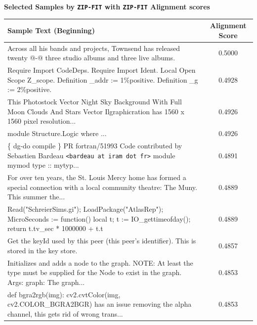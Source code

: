 \begin{table}[htbp]
    \centering
    \textbf{Selected Samples by \texttt{ZIP-FIT} with \texttt{ZIP-FIT} Alignment scores}\\[0.5em] 
    \begin{tabular}{|p{10cm}|c|}
        \hline
        \textbf{Sample Text (Beginning)} & \textbf{Alignment Score} \\ \hline
        Across all his bands and projects, Townsend has released twenty @-@ three studio albums and three live albums. & 0.5000 \\ \hline
        Require Import CodeDeps. Require Import Ident. Local Open Scope Z\_scope. Definition \_addr := 1\%positive. Definition \_g := 2\%positive. & 0.4928 \\ \hline
        This Photostock Vector Night Sky Background With Full Moon Clouds And Stars Vector Ilgraphicration has 1560 x 1560 pixel resolution... & 0.4926 \\ \hline
        module Structure.Logic where ... & 0.4926 \\ \hline
        \{ dg-do compile \} PR fortran/51993 Code contributed by Sebastien Bardeau \texttt{<bardeau at iram dot fr>} module mymod type :: mytyp... & 0.4891 \\ \hline
        For over ten years, the St. Louis Mercy home has formed a special connection with a local community theatre: The Muny. This summer the... & 0.4889 \\ \hline
        Read("SchreierSims.gi"); LoadPackage("AtlasRep"); MicroSeconds := function() local t; t := IO\_gettimeofday(); return t.tv\_sec * 1000000 + t.t & 0.4889 \\ \hline
        Get the keyId used by this peer (this peer's identifier). This is stored in the key store. & 0.4857 \\ \hline
        Initializes and adds a node to the graph. NOTE: At least the type must be supplied for the Node to exist in the graph. Args: graph: The graph... & 0.4853 \\ \hline
        def bgra2rgb(img): cv2.cvtColor(img, cv2.COLOR\_BGRA2BGR) has an issue removing the alpha channel, this gets rid of wrong trans... & 0.4853 \\ \hline

\end{tabular}
\end{table}

